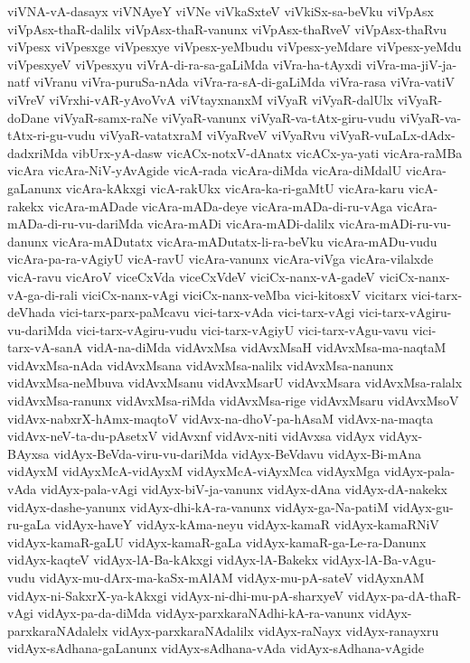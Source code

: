 {viVNA-vA-dasayx
viVNAyeY
viVNe
viVkaSxteV
viVkiSx-sa-beVku
viVpAsx
viVpAsx-thaR-dalilx
viVpAsx-thaR-vanunx
viVpAsx-thaRveV
viVpAsx-thaRvu
viVpesx
viVpesxge
viVpesxye
viVpesx-yeMbudu
viVpesx-yeMdare
viVpesx-yeMdu
viVpesxyeV
viVpesxyu
viVrA-di-ra-sa-gaLiMda
viVra-ha-tAyxdi
viVra-ma-jiV-ja-natf
viVranu
viVra-puruSa-nAda
viVra-ra-sA-di-gaLiMda
viVra-rasa
viVra-vatiV
viVreV
viVrxhi-vAR-yAvoVvA
viVtayxnanxM
viVyaR
viVyaR-dalUlx
viVyaR-doDane
viVyaR-samx-raNe
viVyaR-vanunx
viVyaR-va-tAtx-giru-vudu
viVyaR-va-tAtx-ri-gu-vudu
viVyaR-vatatxraM
viVyaRveV
viVyaRvu
viVyaR-vuLaLx-dAdx-dadxriMda
vibUrx-yA-dasw
vicACx-notxV-dAnatx
vicACx-ya-yati
vicAra-raMBa
vicAra
vicAra-NiV-yAvAgide
vicA-rada
vicAra-diMda
vicAra-diMdalU
vicAra-gaLanunx
vicAra-kAkxgi
vicA-rakUkx
vicAra-ka-ri-gaMtU
vicAra-karu
vicA-rakekx
vicAra-mADade
vicAra-mADa-deye
vicAra-mADa-di-ru-vAga
vicAra-mADa-di-ru-vu-dariMda
vicAra-mADi
vicAra-mADi-dalilx
vicAra-mADi-ru-vu-danunx
vicAra-mADutatx
vicAra-mADutatx-li-ra-beVku
vicAra-mADu-vudu
vicAra-pa-ra-vAgiyU
vicA-ravU
vicAra-vanunx
vicAra-viVga
vicAra-vilalxde
vicA-ravu
vicAroV
viceCxVda
viceCxVdeV
viciCx-nanx-vA-gadeV
viciCx-nanx-vA-ga-di-rali
viciCx-nanx-vAgi
viciCx-nanx-veMba
vici-kitosxV
vicitarx
vici-tarx-deVhada
vici-tarx-parx-paMcavu
vici-tarx-vAda
vici-tarx-vAgi
vici-tarx-vAgiru-vu-dariMda
vici-tarx-vAgiru-vudu
vici-tarx-vAgiyU
vici-tarx-vAgu-vavu
vici-tarx-vA-sanA
vidA-na-diMda
vidAvxMsa
vidAvxMsaH
vidAvxMsa-ma-naqtaM
vidAvxMsa-nAda
vidAvxMsana
vidAvxMsa-nalilx
vidAvxMsa-nanunx
vidAvxMsa-neMbuva
vidAvxMsanu
vidAvxMsarU
vidAvxMsara
vidAvxMsa-ralalx
vidAvxMsa-ranunx
vidAvxMsa-riMda
vidAvxMsa-rige
vidAvxMsaru
vidAvxMsoV
vidAvx-nabxrX-hAmx-maqtoV
vidAvx-na-dhoV-pa-hAsaM
vidAvx-na-maqta
vidAvx-neV-ta-du-pAsetxV
vidAvxnf
vidAvx-niti
vidAvxsa
vidAyx
vidAyx-BAyxsa
vidAyx-BeVda-viru-vu-dariMda
vidAyx-BeVdavu
vidAyx-Bi-mAna
vidAyxM
vidAyxMcA-vidAyxM
vidAyxMcA-viAyxMca
vidAyxMga
vidAyx-pala-vAda
vidAyx-pala-vAgi
vidAyx-biV-ja-vanunx
vidAyx-dAna
vidAyx-dA-nakekx
vidAyx-dashe-yanunx
vidAyx-dhi-kA-ra-vanunx
vidAyx-ga-Na-patiM
vidAyx-gu-ru-gaLa
vidAyx-haveY
vidAyx-kAma-neyu
vidAyx-kamaR
vidAyx-kamaRNiV
vidAyx-kamaR-gaLU
vidAyx-kamaR-gaLa
vidAyx-kamaR-ga-Le-ra-Danunx
vidAyx-kaqteV
vidAyx-lA-Ba-kAkxgi
vidAyx-lA-Bakekx
vidAyx-lA-Ba-vAgu-vudu
vidAyx-mu-dArx-ma-kaSx-mAlAM
vidAyx-mu-pA-sateV
vidAyxnAM
vidAyx-ni-SakxrX-ya-kAkxgi
vidAyx-ni-dhi-mu-pA-sharxyeV
vidAyx-pa-dA-thaR-vAgi
vidAyx-pa-da-diMda
vidAyx-parxkaraNAdhi-kA-ra-vanunx
vidAyx-parxkaraNAdalelx
vidAyx-parxkaraNAdalilx
vidAyx-raNayx
vidAyx-ranayxru
vidAyx-sAdhana-gaLanunx
vidAyx-sAdhana-vAda
vidAyx-sAdhana-vAgide
}
